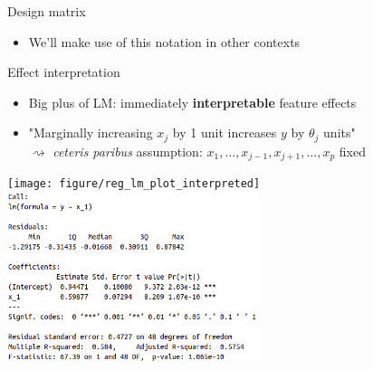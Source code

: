 \documentclass[11pt,compress,t,notes=noshow, xcolor=table]{beamer}
\begin{document}
\begin{vbframe}{Design matrix}
\begin{itemize}
\begin{align*}
\begin{smallmatrix}
            \theta_0 + \theta_1 x_1^{(1)} + \dots + \theta_p x_p^{(1)} \\
            \theta_0 + \theta_1 x_1^{(2)} + \dots + \theta_p x_p^{(2)} \\
            \vdots \\
            \theta_0 + \theta_1 x_1^{(n)} + \dots + \theta_p x_p^{(n)} \\
        \end{smallmatrix}
        \right)
    \end{align*}
    \item We'll make use of this notation in other contexts
\end{itemize}

\end{vbframe}


\begin{vbframe}{Effect interpretation}

\begin{itemize}
    \item Big plus of LM: immediately \textbf{interpretable} feature effects
    \item "Marginally increasing $x_j$ by 1 unit increases $y$ by $\theta_j$ 
    units" \\
    $\rightsquigarrow$ \textit{ceteris paribus} assumption: 
    $x_1, \dots, x_{j - 1}, x_{j + 1}, \dots, x_p$ fixed
\end{itemize}

\vfill
\texttt{[image: figure/reg\_lm\_plot\_interpreted]} 
\hfill
\includegraphics[width=0.55\textwidth]{figure_man/lm_summary} 

\end{vbframe}
\end{document}
